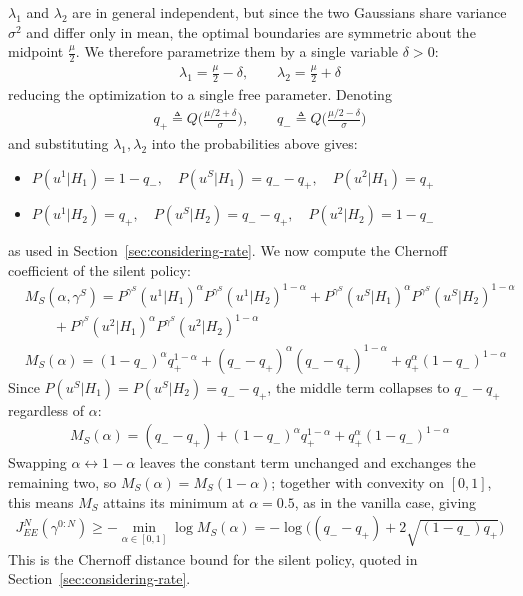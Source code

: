 \documentclass[11pt]{article}
\newcommand{\JNEE}{J^N_{EE}(\gamma^{0:N})}
\begin{document}
$\lambda_1$ and $\lambda_2$ are in general independent, but since the two Gaussians share variance $\sigma^2$ and differ only in mean, the optimal boundaries are symmetric about the midpoint $\frac{\mu}{2}$. We therefore parametrize them by a single variable $\delta > 0$:
\begin{align*}
    \lambda_1 = \frac{\mu}{2} - \delta, \qquad \lambda_2 = \frac{\mu}{2} + \delta
\end{align*}
reducing the optimization to a single free parameter. Denoting
\begin{align*}
    q_+ \triangleq Q\Big(\frac{\mu/2+\delta}{\sigma}\Big), \qquad q_- \triangleq Q\Big(\frac{\mu/2-\delta}{\sigma}\Big)
\end{align*}
and substituting $\lambda_1,\lambda_2$ into the probabilities above gives:
\begin{itemize}
    \item $P(u^1|H_1) = 1-q_-, \quad P(u^S|H_1) = q_- - q_+, \quad P(u^2|H_1) = q_+$
    \item $P(u^1|H_2) = q_+, \quad P(u^S|H_2) = q_- - q_+, \quad P(u^2|H_2) = 1-q_-$
\end{itemize}
as used in Section~\ref{sec:considering-rate}. We now compute the Chernoff coefficient of the silent policy:
\begin{align}
    &M_{S}(\alpha,\gamma^S) = P^{\gamma^S}(u^1|H_1)^\alpha P^{\gamma^S}(u^1|H_2)^{1-\alpha} + P^{\gamma^S}(u^S|H_1)^\alpha P^{\gamma^S}(u^S|H_2)^{1-\alpha}\\
    &\qquad + P^{\gamma^S}(u^2|H_1)^\alpha P^{\gamma^S}(u^2|H_2)^{1-\alpha}\\
    &M_{S}(\alpha) = (1-q_-)^{\alpha}q_+^{1-\alpha} + (q_--q_+)^{\alpha}(q_--q_+)^{1-\alpha} + q_+^{\alpha}(1-q_-)^{1-\alpha}
\end{align}
Since $P(u^S|H_1) = P(u^S|H_2) = q_--q_+$, the middle term collapses to $q_--q_+$ regardless of $\alpha$:
\begin{align}
    M_{S}(\alpha) = (q_--q_+) + (1-q_-)^{\alpha}q_+^{1-\alpha} + q_+^{\alpha}(1-q_-)^{1-\alpha}
\end{align}
Swapping $\alpha \leftrightarrow 1-\alpha$ leaves the constant term unchanged and exchanges the remaining two, so $M_S(\alpha) = M_S(1-\alpha)$; together with convexity on $[0,1]$, this means $M_S$ attains its minimum at $\alpha = 0.5$, as in the vanilla case, giving
\begin{align}
    \JNEE \geq -\min_{\alpha\in[0,1]}\log M_{S}(\alpha) = -\log\Big((q_--q_+) + 2\sqrt{(1-q_-)q_+}\Big)
\end{align}
This is the Chernoff distance bound for the silent policy, quoted in Section~\ref{sec:considering-rate}.
\end{document}
